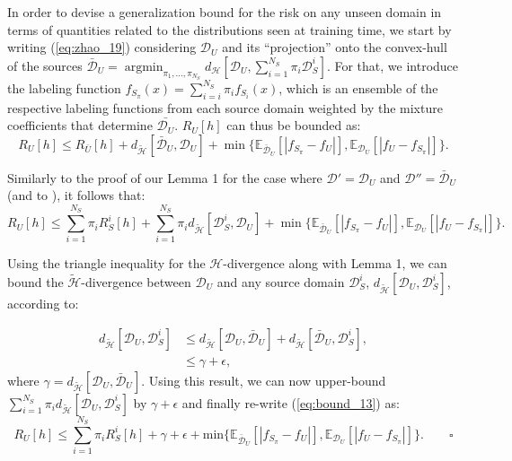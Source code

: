 \documentclass{article}
\DeclareMathOperator*{\argmin}{argmin}
\begin{document}
In order to devise a generalization bound for the risk on any unseen domain in terms of quantities related to the distributions seen at training time, we start by writing (\ref{eq:zhao_19}) considering $\mathcal{D}_U$ and its ``projection'' onto the convex-hull of the sources $\bar{\mathcal{D}}_U=\argmin_{\pi_1, \ldots, \pi_{N_S}}d_{\mathcal{H}}\left[\mathcal{D}_U, \sum_{i=1}^{N_S} \pi_{i} \mathcal{D}^i_S\right]$. For that, we introduce the labeling function $f_{S_{\pi}}(x) = \sum_{i=i}^{N_S} \pi_i f_{S_i}(x)$, which is an ensemble of the respective labeling functions from each source domain weighted by the mixture coefficients that determine $\bar{\mathcal{D}_U}$. $R_U[h]$ can thus be bounded as:
\begin{equation*}\label{eq:bound_12}
        R_U[h] \leq R_{\bar{U}}[h] + d_{\mathcal{\tilde{H}}}[\bar{\mathcal{D}}_U, \mathcal{D}_U] + \min \{\mathbb{E}_{\bar{\mathcal{D}}_{U}}[|f_{S_{\pi}} - f_U|],
    \mathbb{E}_{\mathcal{D}_U}[|f_U - f_{S_{\pi}}|]\}.
\end{equation*}

Similarly to the proof of our Lemma 1 for the case where $\mathcal{D}'=\mathcal{D}_U$ and $\mathcal{D}''=\bar{\mathcal{D}}_U$ (and to \cite{zhao2018adversarial}), it follows that:
\begin{equation}\label{eq:bound_13}
    R_U[h] \leq \sum_{i=1}^{N_S} \pi_i R^i_{S}[h] + \sum_{i=1}^{N_S} \pi_i d_{\mathcal{\tilde{H}}}[\mathcal{D}^i_{S}, \mathcal{D}_U]
    + \min \{\mathbb{E}_{\bar{\mathcal{D}}_{U}}[|f_{S_{\pi}} - f_U|],
    \mathbb{E}_{\mathcal{D}_U}[|f_U - f_{S_{\pi}}|]\}.
\end{equation}

Using the triangle inequality for the $\mathcal{H}$-divergence along with Lemma 1, we can bound the $\mathcal{\tilde{H}}$-divergence between $\mathcal{D}_U$ and any source domain $\mathcal{D}_S^i$, $d_{\mathcal{\tilde{H}}}[\mathcal{D}_U, \mathcal{D}_S^i]$, according to:

\begin{equation*}\label{eq:triangle}
\begin{split}
    d_{\mathcal{\tilde{H}}}[\mathcal{D}_U, \mathcal{D}_S^i] &\leq d_{\mathcal{\tilde{H}}}[\mathcal{D}_U, \bar{\mathcal{D}}_U] + d_{\mathcal{\tilde{H}}}[\bar{\mathcal{D}}_U, \mathcal{D}_S^i], \\
    &\leq \gamma + \epsilon,
\end{split}    
\end{equation*}
where $\gamma = d_{\mathcal{\tilde{H}}}[\mathcal{D}_U, \bar{\mathcal{D}}_U]$. Using this result, we can now upper-bound $\sum_{i=1}^{N_S} \pi_{i} d_{\mathcal{\tilde{H}}}[\mathcal{D}_U, \mathcal{D}^i_S]$ by $\gamma+\epsilon$ and finally re-write (\ref{eq:bound_13}) as:
\begin{equation*}\label{eq:bound_final}
 R_U[h] \leq \sum_{i=1}^{N_S} \pi_{i} R^i_S[h] + \gamma+\epsilon
 + \text{min}\{\mathbb{E}_{\bar{\mathcal{D}}_U}[|f_{S_{\pi}} - f_U|], \mathbb{E}_{\mathcal{D}_U}[|f_U - f_{S_\pi}|]\}.   \qquad \square
\end{equation*}
\end{document}
